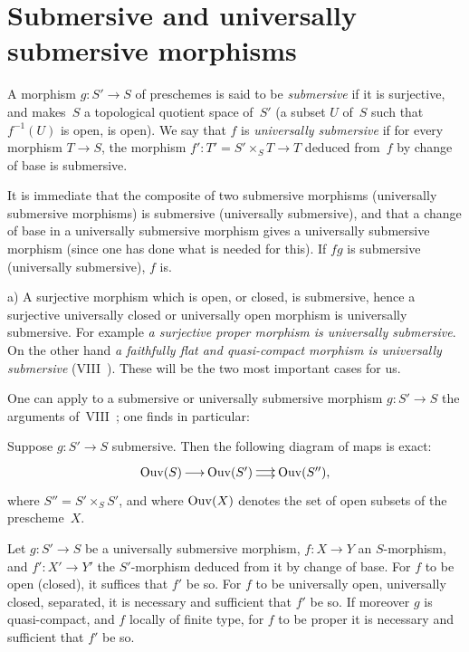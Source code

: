 \section{Submersive and universally submersive morphisms}
\label{IX.2}

\begin{definition}
\label{IX.2.1}
A morphism $g\colon S' \to S$ of preschemes is said to be
\emph{submersive}
if it is surjective, and makes~$S$ a topological quotient space
of~$S'$ (\ie a subset $U$ of~$S$ such that $f^{-1}(U)$ is
open, is open). We say that $f$ is \emph{universally
submersive}
if for every morphism $T \to S$, the morphism $f'\colon T'=S'\times_S
T \to T$ deduced from~$f$ by change of base is submersive.
\end{definition}

It is immediate that the composite of two submersive morphisms
(\resp universally submersive morphisms) is submersive
(\resp universally submersive), and that a change of base in a
universally submersive morphism gives a universally submersive
morphism (since one has done what is needed for this). If $fg$ is
submersive (\resp universally submersive), $f$ is.
\begin{examples}
\label{IX.2.2}
a) A surjective morphism which is open, or closed, is submersive,
hence a surjective universally closed or
universally open morphism is universally submersive. For example
\emph{a surjective proper morphism is universally
submersive}. On the other hand \emph{a faithfully flat and
quasi-compact morphism is universally submersive} (VIII~). These
will be the two most important cases for us.
\end{examples}

One
can apply to a submersive or universally
submersive morphism $g\colon S' \to S$ the arguments of~VIII~;
one finds in particular:
\begin{proposition}
\label{IX.2.3}
Suppose $g\colon S' \to S$ submersive. Then the following diagram
of maps is exact:
$$
\xymatrix@C=.5cm{\Ouv (S)\ar[r] &
\Ouv (S')\ar@<2pt>[r]\ar@<-2pt>[r] & \Ouv(S''),}
$$
where $S'' = S'\times_S S'$, and where $\operatorname{Ouv}(X)$ denotes
the set of open subsets of the prescheme~$X$.
\end{proposition}

\begin{proposition}
\label{IX.2.4}
Let $g\colon S' \to S$ be a universally submersive morphism,
$f\colon X \to Y$ an $S$-morphism, and $f'\colon X' \to Y'$ the
$S'$-morphism deduced from it by change of base. For
$f$ to be open (\resp closed), it suffices that $f'$ be so. For
$f$ to be universally open, \resp universally
closed, \resp separated, it is necessary and sufficient that $f'$
be so. If moreover $g$ is quasi-compact, and $f$ locally of finite
type, for $f$ to be proper it is necessary and sufficient that $f'$ be so.
\end{proposition}

